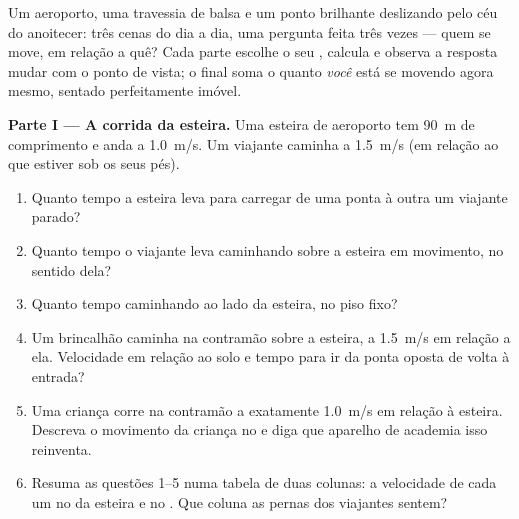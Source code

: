 \begin{problem}
\label{pb:g10:relative-motion:1}
Um aeroporto, uma travessia de balsa e um ponto brilhante deslizando pelo
céu do anoitecer: três cenas do dia a dia, uma pergunta feita três vezes
--- quem se move, em relação a quê? Cada parte escolhe o seu ,
calcula e observa a resposta mudar com o ponto de vista; o final soma o
quanto \emph{você} está se movendo agora mesmo, sentado perfeitamente
imóvel.

\medskip
\noindent\textbf{Parte I --- A corrida da esteira.}
Uma esteira de aeroporto tem \qty{90}{m} de comprimento e anda a
\qty{1.0}{m/s}. Um viajante caminha a \qty{1.5}{m/s} (em relação ao que
estiver sob os seus pés).
\begin{enumerate}
  \item Quanto tempo a esteira leva para carregar de uma ponta à outra um
        viajante parado?
  \item Quanto tempo o viajante leva caminhando sobre a esteira em
        movimento, no sentido dela?
  \item Quanto tempo caminhando ao lado da esteira, no piso fixo?
  \item Um brincalhão caminha na contramão sobre a esteira, a
        \qty{1.5}{m/s} em relação a ela. Velocidade em relação ao solo e
        tempo para ir da ponta oposta de volta à entrada?
  \item Uma criança corre na contramão a exatamente \qty{1.0}{m/s} em
        relação à esteira. Descreva o movimento da criança no  e diga que aparelho de academia isso reinventa.
  \item Resuma as questões 1--5 numa tabela de duas colunas: a velocidade
        de cada um no  da esteira e no .
        Que coluna as pernas dos viajantes sentem?
\end{enumerate}


\end{problem}

